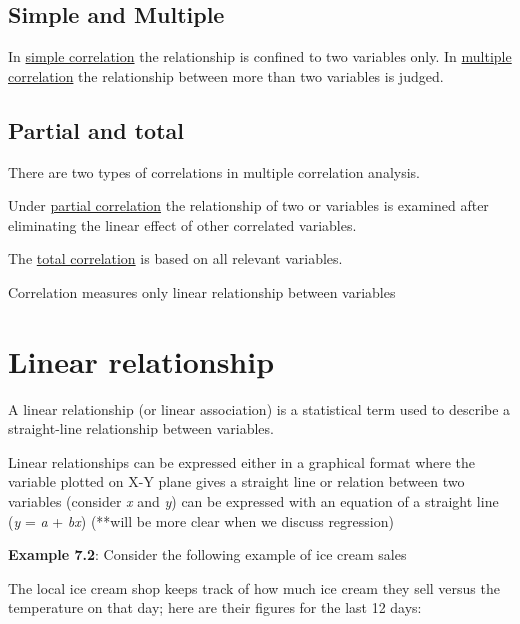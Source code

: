 \documentclass[
]{book}
\renewenvironment{quote}{\begin{VF}}{\end{VF}}
\begin{document}
\hypertarget{simple-and-multiple}{%
\subsection{Simple and Multiple}\label{simple-and-multiple}}

In \underline{simple correlation} the relationship
is confined to two variables only. In \underline{multiple correlation} the
relationship between more than two variables is judged.

\hypertarget{partial-and-total}{%
\subsection{Partial and total}\label{partial-and-total}}

There are two types of correlations in multiple
correlation analysis.

Under \underline{partial correlation} the relationship of two or variables is
examined after eliminating the linear effect of other correlated
variables.

The \underline{total correlation} is based on all relevant variables.

\begin{quote}
Correlation measures only linear relationship between variables
\end{quote}

\hypertarget{linear-relationship}{%
\section{Linear relationship}\label{linear-relationship}}

A linear relationship (or linear association)
is a statistical term used to describe a straight-line relationship
between variables.

Linear relationships can be expressed either in a graphical format where
the variable plotted on X-Y plane gives a straight line or relation
between two variables (consider \emph{x} and \emph{y}) can be expressed with an
equation of a straight line (\emph{y} = \emph{a} + \emph{bx}) (**will be more clear
when we discuss regression)

\textbf{Example 7.2}: Consider the following example of ice cream sales

The local ice cream shop keeps track of how much ice cream they sell
versus the temperature on that day; here are their figures for the last
12 days:
\end{document}
